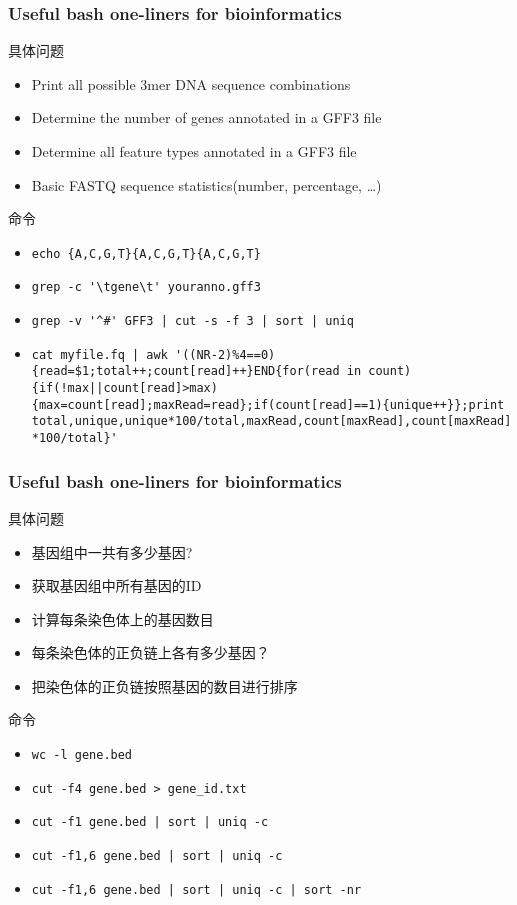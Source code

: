 \begin{frame}[fragile]
  \frametitle{Useful bash one-liners for bioinformatics}
  \begin{block}{具体问题}
    \begin{itemize}
      \item<2-> Print all possible 3mer DNA sequence combinations
      \item<4-> Determine the number of genes annotated in a GFF3 file
      \item<6-> Determine all feature types annotated in a GFF3 file
      \item<8-> Basic FASTQ sequence statistics(number, percentage, \ldots)
    \end{itemize}
  \end{block}
  \begin{block}{命令}
    \begin{itemize}
      \item<3-> \verb=echo {A,C,G,T}{A,C,G,T}{A,C,G,T}=
      \item<5-> \verb|grep -c '\tgene\t' youranno.gff3|
      \item<7-> \verb~grep -v '^#' GFF3 | cut -s -f 3 | sort | uniq~
      \item<9-> {\tiny \verb~cat myfile.fq | awk '((NR-2)%4==0){read=$1;total++;count[read]++}END{for(read in count){if(!max||count[read]>max) {max=count[read];maxRead=read};if(count[read]==1){unique++}};print total,unique,unique*100/total,maxRead,count[maxRead],count[maxRead]*100/total}'~}
    \end{itemize}
  \end{block}
\end{frame}

\begin{frame}[fragile]
  \frametitle{\alert{Useful bash one-liners for bioinformatics}}
  \begin{block}{具体问题}
    \begin{itemize}
      \item<2-> 基因组中一共有多少基因?
      \item<4-> 获取基因组中所有基因的ID
      \item<6-> 计算每条染色体上的基因数目
      \item<8-> 每条染色体的正负链上各有多少基因？
      \item<10-> 把染色体的正负链按照基因的数目进行排序
    \end{itemize}
  \end{block}
  \begin{block}{命令}
    \begin{itemize}
      \item<3-> \verb=wc -l gene.bed=
      \item<5-> \verb|cut -f4 gene.bed > gene_id.txt|
      \item<7-> \verb=cut -f1 gene.bed | sort | uniq -c=
      \item<9-> \verb=cut -f1,6 gene.bed | sort | uniq -c=
      \item<11-> \verb=cut -f1,6 gene.bed | sort | uniq -c | sort -nr=
    \end{itemize}
  \end{block}
\end{frame}

